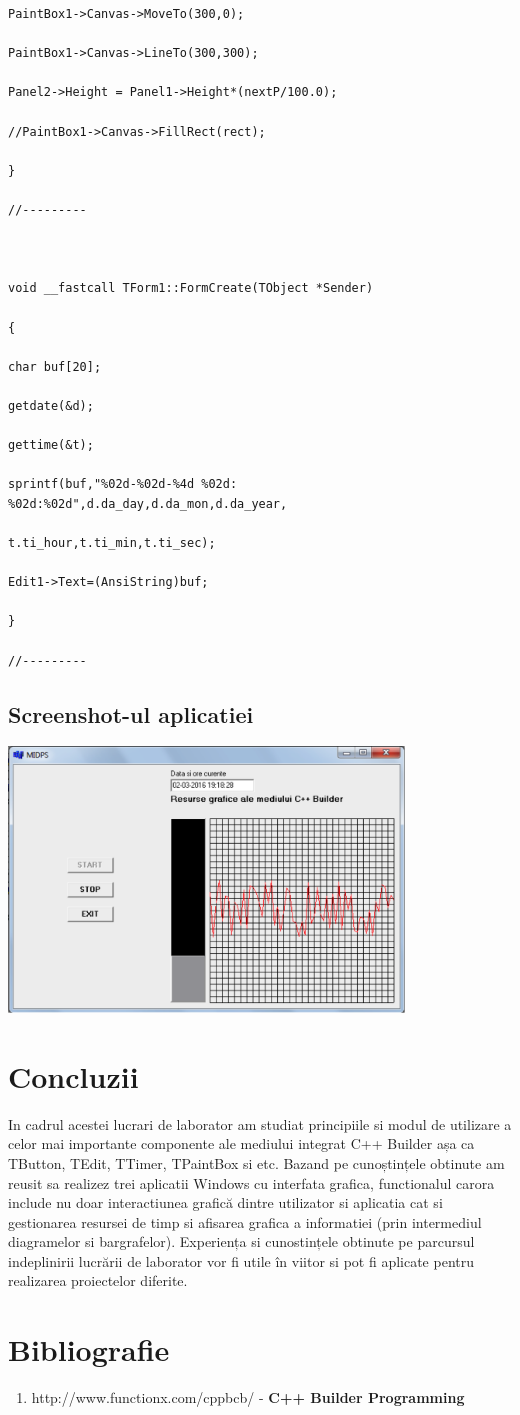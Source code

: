 \documentclass[12pt]{article}
\begin{document}
\begin{lstlisting}
PaintBox1->Canvas->MoveTo(300,0);

PaintBox1->Canvas->LineTo(300,300);

Panel2->Height = Panel1->Height*(nextP/100.0);

//PaintBox1->Canvas->FillRect(rect);

}

//---------



void __fastcall TForm1::FormCreate(TObject *Sender)

{

char buf[20];

getdate(&d);

gettime(&t);

sprintf(buf,"%02d-%02d-%4d %02d:
%02d:%02d",d.da_day,d.da_mon,d.da_year,

t.ti_hour,t.ti_min,t.ti_sec);

Edit1->Text=(AnsiString)buf;        

}

//---------
\end{lstlisting}
\subsection{Screenshot-ul aplicatiei}
\includegraphics[width=10.5cm]{images/8}
\section*{Concluzii}
In cadrul acestei lucrari de laborator am studiat principiile si modul de utilizare a celor mai importante componente ale mediului integrat C++ Builder așa ca TButton, TEdit, TTimer, TPaintBox si etc. Bazand pe cunoștințele obtinute am reusit sa realizez trei aplicatii Windows cu interfata grafica, functionalul carora include nu doar interactiunea grafică dintre utilizator si aplicatia cat si gestionarea resursei de timp si afisarea grafica a informatiei (prin intermediul diagramelor si bargrafelor). Experiența si cunostințele obtinute pe parcursul indeplinirii lucrării de laborator vor fi utile în viitor si pot fi aplicate pentru realizarea proiectelor diferite.
\section*{Bibliografie}
\begin{enumerate}
\item http://www.functionx.com/cppbcb/ - \textbf{C++ Builder Programming}
\end{enumerate}
\end{document}
